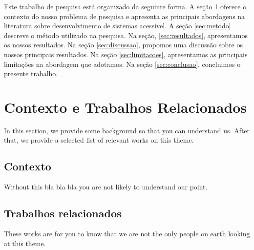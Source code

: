 \documentclass[sigconf]{acmart}
\begin{document}
Este trabalho de pesquisa está organizado da seguinte forma. A seção \ref{sec:contexto-e-trabalhos-relacionados} oferece o contexto do nosso problema de pesquisa e apresenta as principais abordagens na literatura sobre desenvolvimento de sistemas acessível. A seção \ref{sec:metodo} descreve o método utilizado na pesquisa. Na seção, \ref{sec:resultados}, apresentamos os nossos resultados. Na seção \ref{sec:discussao}, propomos uma discussão sobre os nossos principais resultados. Na seção \ref{sec:limitacoes}, apresentamos as principais limitações na abordagem que adotamos. Na seção \ref{sec:conclusao}, concluimos o presente trabalho.







\section{Contexto e Trabalhos Relacionados}
\label{sec:contexto-e-trabalhos-relacionados}

In this section, we provide some background so that you can understand us. After that, we provide a selected list of relevant works on this theme.





\subsection{Contexto}

Without this bla bla bla you are not likely to understand our point.





\subsection{Trabalhos relacionados}

These works are for you to know that we are not the only people on earth looking at this theme.









\end{document}

